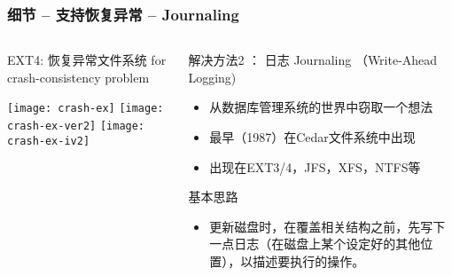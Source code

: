 \begin{frame}[fragile]
	\frametitle{细节 -- 支持恢复异常 -- Journaling}
	\begin{columns}
		\begin{column}{.4\textwidth}
			EXT4: 恢复异常文件系统 for crash-consistency problem
			
			\centering
			\texttt{[image: crash-ex]}
			\texttt{[image: crash-ex-ver2]}
			\texttt{[image: crash-ex-iv2]}	
		\end{column}
		\begin{column}{.6\textwidth}			
			解决方法2 ： 日志 Journaling （Write-Ahead Logging)
			\begin{itemize}
				\item 从数据库管理系统的世界中窃取一个想法
				\item 最早（1987）在Cedar文件系统中出现
				\item 出现在EXT3/4，JFS，XFS，NTFS等
			\end{itemize}
			\pause
			基本思路
			\begin{itemize}	
				\item 更新磁盘时，在覆盖相关结构之前，先写下一点日志（在磁盘上某个设定好的其他位置），以描述要执行的操作。
			\end{itemize}

		\end{column}
	\end{columns}
	
\end{frame}


